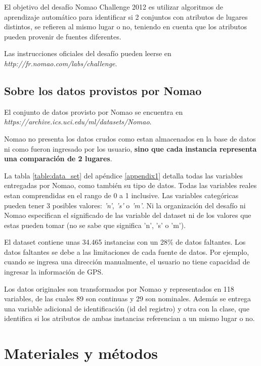 \documentclass[journal]{IEEEtran}
\begin{document}
El objetivo del desafío Nomao Challenge 2012 es utilizar 
algoritmos de aprendizaje automático para identificar si 
2 conjuntos con atributos de lugares distintos, se refieren al mismo
lugar o no, teniendo en cuenta que los atributos 
pueden provenir de fuentes diferentes.

Las instrucciones oficiales del desafío pueden leerse en 
\textit{http://fr.nomao.com/labs/challenge}.

\subsection{Sobre los datos provistos por Nomao}

El conjunto de datos provisto por Nomao se encuentra en
\textit{https://archive.ics.uci.edu/ml/datasets/Nomao}. 

Nomao no presenta los datos crudos como estan almacenados en la 
base de datos ni como fueron ingresado por los usuario, \textbf{sino que  
cada instancia representa una comparación de 
2 lugares}. 

La tabla \ref{table:data_set} del apéndice \ref{appendix1} 
detalla todas las variables entregadas por 
Nomao, como también su tipo de datos. Todas las variables reales estan comprendidas
en el rango de 0 a 1 inclusive. Las variables
categóricas pueden tener 3 posibles valores: \textit{'n'}, \textit{'s'} 
o \textit{'m'}. Ni la organización del desafío ni Nomao especifican 
el significado de las variable del dataset ni de los valores
que estas pueden tomar (no se sabe que significa 'n', 's' o 'm').

El dataset contiene unas 34.465 instancias con un 28\% de datos faltantes.
Los datos faltantes se debe a las limitaciones de cada fuente de datos. Por
ejemplo, cuando se ingresa una dirección manualmente, el usuario no tiene
capacidad de ingresar la información de GPS.

Los datos originales son transformados por Nomao y representados
en 118 variables, de las cuales 89 son continuas y 29 son
nominales. Además se entrega una variable adicional de identificación 
(id del registro) y
otra con la clase, que identifica si los atributos de ambas 
instancias referencian a un mismo lugar o no. 

\section{Materiales y métodos}
\end{document}
